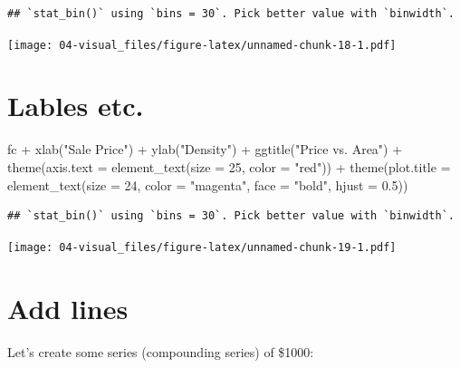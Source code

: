\documentclass[
]{book}
\newenvironment{Shaded}{\begin{snugshade}}{\end{snugshade}}
\newcommand{\AttributeTok}[1]{\textcolor[rgb]{0.77,0.63,0.00}{#1}}
\newcommand{\DecValTok}[1]{\textcolor[rgb]{0.00,0.00,0.81}{#1}}
\newcommand{\FloatTok}[1]{\textcolor[rgb]{0.00,0.00,0.81}{#1}}
\newcommand{\FunctionTok}[1]{\textcolor[rgb]{0.00,0.00,0.00}{#1}}
\newcommand{\NormalTok}[1]{#1}
\newcommand{\SpecialCharTok}[1]{\textcolor[rgb]{0.00,0.00,0.00}{#1}}
\newcommand{\StringTok}[1]{\textcolor[rgb]{0.31,0.60,0.02}{#1}}
\begin{document}
\begin{verbatim}
## `stat_bin()` using `bins = 30`. Pick better value with `binwidth`.
\end{verbatim}

\texttt{[image: 04-visual\_files/figure-latex/unnamed-chunk-18-1.pdf]}

\hypertarget{lables-etc.}{%
\section{Lables etc.}\label{lables-etc.}}

\begin{Shaded}
\begin{Highlighting}[]
\NormalTok{fc }\SpecialCharTok{+} 
  \FunctionTok{xlab}\NormalTok{(}\StringTok{"Sale Price"}\NormalTok{) }\SpecialCharTok{+} 
  \FunctionTok{ylab}\NormalTok{(}\StringTok{"Density"}\NormalTok{) }\SpecialCharTok{+} 
  \FunctionTok{ggtitle}\NormalTok{(}\StringTok{"Price vs. Area"}\NormalTok{) }\SpecialCharTok{+}
  \FunctionTok{theme}\NormalTok{(}\AttributeTok{axis.text =} \FunctionTok{element\_text}\NormalTok{(}\AttributeTok{size =} \DecValTok{25}\NormalTok{, }\AttributeTok{color =} \StringTok{"red"}\NormalTok{)) }\SpecialCharTok{+}
  \FunctionTok{theme}\NormalTok{(}\AttributeTok{plot.title =} \FunctionTok{element\_text}\NormalTok{(}\AttributeTok{size =} \DecValTok{24}\NormalTok{, }
                                     \AttributeTok{color =} \StringTok{"magenta"}\NormalTok{, }
                                     \AttributeTok{face =} \StringTok{"bold"}\NormalTok{,}
                                     \AttributeTok{hjust =} \FloatTok{0.5}\NormalTok{)) }
\end{Highlighting}
\end{Shaded}

\begin{verbatim}
## `stat_bin()` using `bins = 30`. Pick better value with `binwidth`.
\end{verbatim}

\texttt{[image: 04-visual\_files/figure-latex/unnamed-chunk-19-1.pdf]}

\hypertarget{add-lines}{%
\section{Add lines}\label{add-lines}}

Let's create some series (compounding series) of \$1000:
\end{document}
